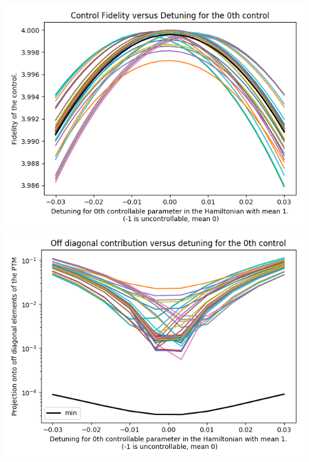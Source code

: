 \documentclass{article}
\begin{document}
\begin{center}
\includegraphics[scale=.9]{control_fid_1}
\includegraphics[scale=.9]{off_diag_1}

\end{center}
\end{document}

